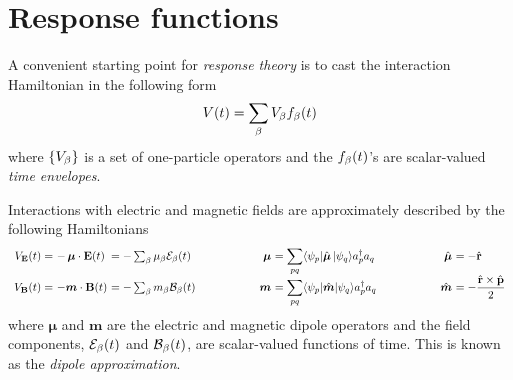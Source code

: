 \documentclass[11pt]{article}
\numberwithin{equation}{section}
\begin{document}
\begin{prop}
\end{prop}



\newpage
\section{Response functions}

\begin{rmk}
A convenient starting point for \textit{response theory} is to cast the interaction Hamiltonian in the following form
\begin{align}
\label{}
  V(t)
=
  \sum_{\beta }
  V_{\beta }
  f_{\beta }(t)
\end{align}
where $\{V_{\beta }\}$ is a set of one-particle operators and the $f_{\beta }(t)$'s are scalar-valued \textit{time envelopes}.
\end{rmk}

\begin{ex}
Interactions with electric and magnetic fields are approximately described by the following Hamiltonians
\begin{align}
\begin{array}{r@{\ }l@{\ }l@{\hspace{2cm}}r@{\ }l@{\hspace{2cm}}r@{\ }l}
  V_{\bo{E}}(t)
=&
-\,
  \bm{\mu}\cdot\bo{E}(t)
&=
-
  \sum_\b
  \mu_\b
  \mc{E}_\b(t)
&
  \bm{\mu}
&=
\ds{
  \sum_{pq}
  \ip{\y_p|\op{\bm{\mu}}\,|\y_q}
  a_p\dg a_q
}
&
  \op{\bm{\mu}}
&=
-
  \op{\bo{r}}
\\
  V_{\bo{B}}(t)
=&
-
  \bm{m}\cdot\bo{B}(t)
&=
-
  \sum_\b
  m_\b
  \mc{B}_\b(t)
&
  \bm{m}
&=
\ds{
  \sum_{pq}
  \ip{\y_p|\op{\bm{m}}|\y_q}
  a_p\dg a_q
}
&
  \op{\bm{m}}
&=
-
  \dfr{\op{\bo{r}}\times\op{\bo{p}}}{2}
\end{array}
\end{align}
where $\bm{\mu}$ and $\bm{m}$ are the electric and magnetic dipole operators and the field components, $\mathcal{E}_{\beta }(t)$ and $\mathcal{B}_{\beta }(t)$, are scalar-valued functions of time.
This is known as the \textit{dipole approximation}.
\end{ex}
\end{document}
